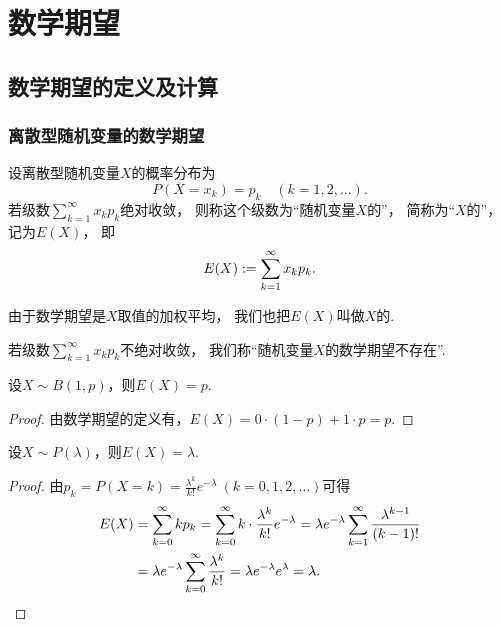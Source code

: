\section{数学期望}
\subsection{数学期望的定义及计算}
\subsubsection{离散型随机变量的数学期望}
\begin{definition}
设离散型随机变量\(X\)的概率分布为\[
	P(X=x_k) = p_k
	\quad(k=1,2,\dotsc).
\]
若级数\(\sum_{k=1}^\infty x_k p_k\)绝对收敛，
则称这个级数为“随机变量\(X\)的”，
简称为“\(X\)的”，
记为\(E(X)\)，
即\begin{equation}\label{equation:随机变量的数字特征.数学期望的定义式}
	E(X) := \sum_{k=1}^\infty x_k p_k.
\end{equation}

由于数学期望是\(X\)取值的加权平均，
我们也把\(E(X)\)叫做\(X\)的.

若级数\(\sum_{k=1}^\infty x_k p_k\)不绝对收敛，
我们称“随机变量\(X\)的数学期望不存在”.
\end{definition}

\begin{proposition}\label{theorem:随机变量的数字特征.0-1分布的数学期望}
设\(X \sim B(1,p)\)，则\(E(X) = p\).
\begin{proof}
由数学期望的定义有，\(E(X) = 0 \cdot (1-p) + 1 \cdot p = p\).
\end{proof}
\end{proposition}

\begin{proposition}\label{theorem:随机变量的数字特征.泊松分布的数学期望}
设\(X \sim P(\lambda)\)，则\(E(X) = \lambda\).
\begin{proof}
由\(p_k = P(X=k) = \frac{\lambda^k}{k!} e^{-\lambda}\ (k=0,1,2,\dotsc)\)可得
\begin{align*}
	E(X) &= \sum_{k=0}^\infty k p_k
	= \sum_{k=0}^\infty k \cdot \frac{\lambda^k}{k!} e^{-\lambda}
	= \lambda e^{-\lambda} \sum_{k=1}^\infty \frac{\lambda^{k-1}}{(k-1)!} \\
	&= \lambda e^{-\lambda} \sum_{k=0}^\infty \frac{\lambda^k}{k!}
	= \lambda e^{-\lambda} e^\lambda
	= \lambda.
	\qedhere
\end{align*}
\end{proof}
\end{proposition}

